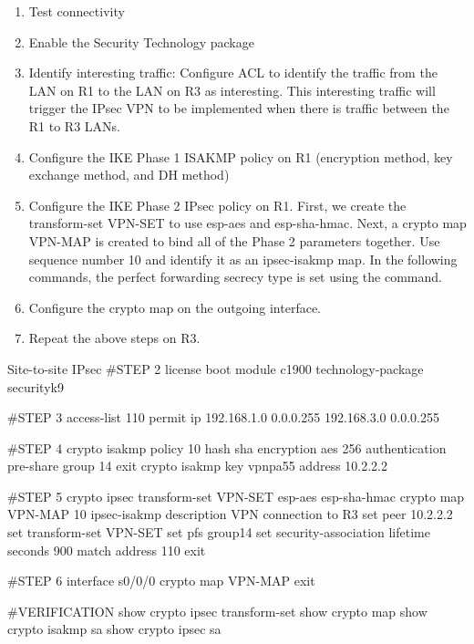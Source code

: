 \begin{enumerate}
\item Test connectivity
\item Enable the Security Technology package
\item Identify interesting traffic: Configure ACL to identify the traffic from the LAN on R1 to the LAN on R3 as interesting. This interesting
traffic will trigger the IPsec VPN to be implemented when there is traffic between the R1 to R3 LANs.
\item Configure the IKE Phase 1 ISAKMP policy on R1 (encryption method, key exchange method, and DH method)
\item Configure the IKE Phase 2 IPsec policy on R1. First, we create the transform-set VPN-SET to use esp-aes and esp-sha-hmac. Next, a crypto map VPN-MAP is created to bind all of the Phase 2 parameters together. Use sequence number 10 and identify it as an ipsec-isakmp map. In the following commands,	the perfect forwarding secrecy type is set using the  command.
\item Configure the crypto map on the outgoing interface.
\item Repeat the above steps on R3.
\end{enumerate}

\begin{sexylisting}{Site-to-site IPsec}
#STEP 2
license boot module c1900 technology-package securityk9

#STEP 3
access-list 110 permit ip 192.168.1.0 0.0.0.255 192.168.3.0 0.0.0.255

#STEP 4
crypto isakmp policy 10
	hash sha 
	encryption aes 256
	authentication pre-share
	group 14
	exit
crypto isakmp key vpnpa55 address 10.2.2.2	

#STEP 5
crypto ipsec transform-set VPN-SET esp-aes esp-sha-hmac
crypto map VPN-MAP 10 ipsec-isakmp
	description VPN connection to R3
	set peer 10.2.2.2
	set transform-set VPN-SET
	set pfs group14
	set security-association lifetime seconds 900 
	match address 110
	exit

#STEP 6
interface s0/0/0
	crypto map VPN-MAP
	exit

#VERIFICATION
show crypto ipsec transform-set 
show crypto map
show crypto isakmp sa
show crypto ipsec sa		
\end{sexylisting}
